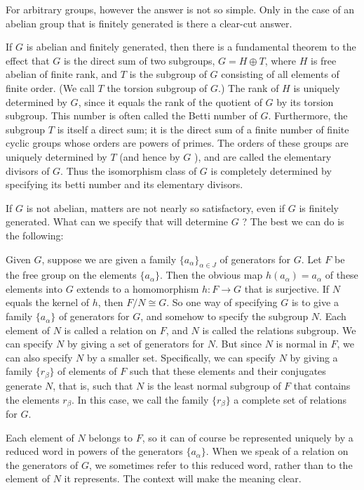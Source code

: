 For arbitrary groups, however the answer is not so simple. Only in the case of an abelian group that is finitely generated is there a clear-cut answer.

If \(G\) is abelian and finitely generated, then there is a fundamental theorem to the effect that \(G\) is the direct sum of two subgroups, \(G = H \oplus T\), where \(H\) is free abelian of finite rank, and \(T\) is the subgroup of \(G\) consisting of all elements of finite order. (We call \(T\) the torsion subgroup of \(G\).) The rank of \(H\) is uniquely determined by \(G\), since it equals the rank of the quotient of \(G\) by its torsion subgroup. This number is often called the Betti number of \(G\). Furthermore, the subgroup \(T\) is itself a direct sum; it is the direct sum of a finite number of finite cyclic groups whose orders are powers of primes. The orders of these groups are uniquely determined by \(T\) (and hence by \(G\) ), and are called the elementary divisors of \(G\). Thus the isomorphism class of \(G\) is completely determined by specifying its betti number and its elementary divisors.

If \(G\) is not abelian, matters are not nearly so satisfactory, even if \(G\) is finitely generated. What can we specify that will determine \(G\) ? The best we can do is the following:

Given \(G\), suppose we are given a family \({\{ a_{\alpha }\} }_{\alpha \in J}\) of generators for \(G\). Let \(F\) be the free group on the elements \(\{ a_{\alpha }\}\). Then the obvious map \(h( a_{\alpha }) = a_{\alpha }\) of these elements into \(G\) extends to a homomorphism \(h : F \rightarrow G\) that is surjective. If \(N\) equals the kernel of \(h\), then \(F/N \cong G\). So one way of specifying \(G\) is to give a family \(\{ a_{\alpha }\}\) of generators for \(G\), and somehow to specify the subgroup \(N\). Each element of \(N\) is called a relation on \(F\), and \(N\) is called the relations subgroup. We can specify \(N\) by giving a set of generators for \(N\). But since \(N\) is normal in \(F\), we can also specify \(N\) by a smaller set. Specifically, we can specify \(N\) by giving a family \(\{ r_{\beta }\}\) of elements of \(F\) such that these elements and their conjugates generate \(N\), that is, such that \(N\) is the least normal subgroup of \(F\) that contains the elements \(r_{\beta }\). In this case, we call the family \(\{ r_{\beta }\}\) a complete set of relations for \(G\).

Each element of \(N\) belongs to \(F\), so it can of course be represented uniquely by a reduced word in powers of the generators \(\{ a_{\alpha }\}\). When we speak of a relation on the generators of \(G\), we sometimes refer to this reduced word, rather than to the element of \(N\) it represents. The context will make the meaning clear.

